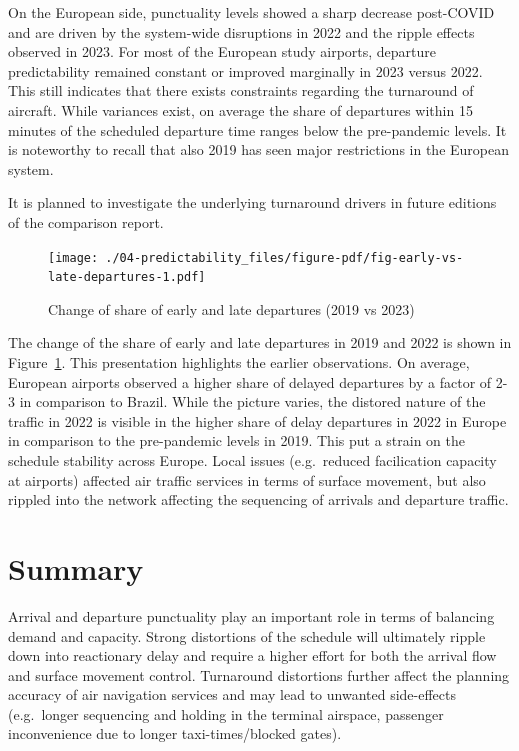 \documentclass[
  a4paper,
  DIV=11,
  numbers=noendperiod]{scrreport}
\begin{document}
On the European side, punctuality levels showed a sharp decrease
post-COVID and are driven by the system-wide disruptions in 2022 and the
ripple effects observed in 2023. For most of the European study
airports, departure predictability remained constant or improved
marginally in 2023 versus 2022. This still indicates that there exists
constraints regarding the turnaround of aircraft. While variances exist,
on average the share of departures within 15 minutes of the scheduled
departure time ranges below the pre-pandemic levels. It is noteworthy to
recall that also 2019 has seen major restrictions in the European
system.

It is planned to investigate the underlying turnaround drivers in future
editions of the comparison report.

\begin{figure}[H]

{\centering \texttt{[image: ./04-predictability\_files/figure-pdf/fig-early-vs-late-departures-1.pdf]}

}

\caption{\label{fig-early-vs-late-departures}Change of share of early
and late departures (2019 vs 2023)}

\end{figure}

The change of the share of early and late departures in 2019 and 2022 is
shown in Figure~\ref{fig-early-vs-late-departures}. This presentation
highlights the earlier observations. On average, European airports
observed a higher share of delayed departures by a factor of 2-3 in
comparison to Brazil. While the picture varies, the distored nature of
the traffic in 2022 is visible in the higher share of delay departures
in 2022 in Europe in comparison to the pre-pandemic levels in 2019. This
put a strain on the schedule stability across Europe. Local issues
(e.g.~reduced facilication capacity at airports) affected air traffic
services in terms of surface movement, but also rippled into the network
affecting the sequencing of arrivals and departure traffic.

\hypertarget{summary-2}{%
\section{Summary}\label{summary-2}}

Arrival and departure punctuality play an important role in terms of
balancing demand and capacity. Strong distortions of the schedule will
ultimately ripple down into reactionary delay and require a higher
effort for both the arrival flow and surface movement control.
Turnaround distortions further affect the planning accuracy of air
navigation services and may lead to unwanted side-effects (e.g.~longer
sequencing and holding in the terminal airspace, passenger inconvenience
due to longer taxi-times/blocked gates).
\end{document}
